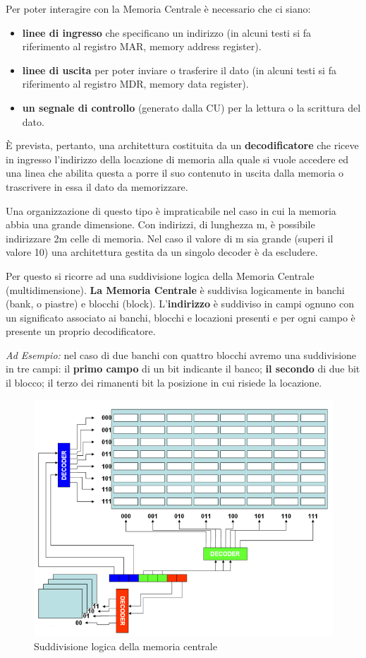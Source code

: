 \documentclass[12pt]{article} %
\begin{document}
Per poter interagire con la Memoria Centrale è necessario che ci siano:
\begin{itemize}
    \item \textbf{linee di ingresso} che specificano un indirizzo (in alcuni testi si fa riferimento al registro MAR, memory address register).
    \item \textbf{linee di uscita} per poter inviare o trasferire il dato (in alcuni testi si fa riferimento al registro MDR, memory data register).
    \item \textbf{un segnale di controllo} (generato dalla CU) per la lettura o la scrittura del dato.\par\medskip\noindent
\end{itemize}
È prevista, pertanto, una architettura costituita da un \textbf{decodificatore} che riceve in ingresso 
l’indirizzo della locazione di memoria alla quale si vuole accedere ed una linea che abilita questa a porre il suo contenuto in uscita dalla memoria o trascrivere in essa il dato da memorizzare.\par\medskip\noindent
Una organizzazione di questo tipo è impraticabile nel caso in cui la memoria abbia una grande dimensione. Con indirizzi, di lunghezza m, è possibile indirizzare 2m celle di memoria. Nel caso il valore di m sia grande (superi il valore 10) una architettura gestita da un singolo decoder è da escludere.\par\medskip\noindent
Per questo si ricorre ad una suddivisione logica della Memoria Centrale (multidimensione). \textbf{La Memoria Centrale} è suddivisa logicamente in banchi (bank, o piastre) e blocchi (block). L’\textbf{indirizzo} è suddiviso in campi ognuno con un significato associato ai banchi, blocchi e locazioni presenti e per ogni campo è presente un proprio decodificatore.\par\medskip\noindent
\textit{Ad Esempio:} nel caso di due banchi con quattro blocchi avremo una suddivisione in
tre campi: il \textbf{primo campo} di un bit indicante il banco; \textbf{il secondo} di due bit il blocco; il terzo dei rimanenti bit la posizione in cui risiede la locazione.
\newpage
\begin{figure}[t]
    \centering
    \includegraphics[width=0.75\linewidth]{Memoria Centrale .png}
    \caption{Suddivisione logica della memoria centrale}
\end{figure}
\end{document}
